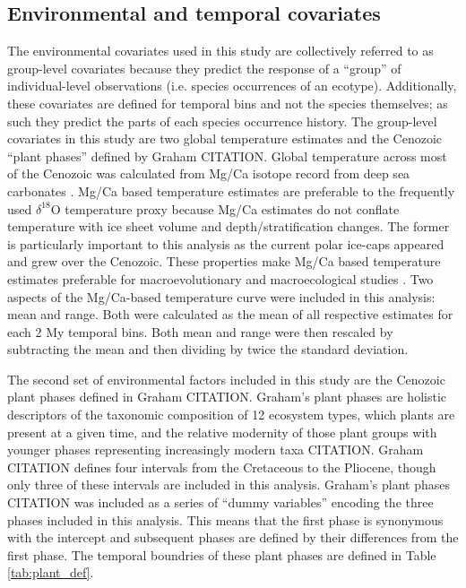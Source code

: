 \documentclass[12pt,letterpaper]{article}
\begin{document}
\subsection*{Environmental and temporal covariates}
The environmental covariates used in this study are collectively referred to as group-level covariates because they predict the response of a ``group'' of individual-level observations (i.e. species occurrences of an ecotype). Additionally, these covariates are defined for temporal bins and not the species themselves; as such they predict the parts of each species occurrence history. The group-level covariates in this study are two global temperature estimates and the Cenozoic ``plant phases'' defined by Graham CITATION. Global temperature across most of the Cenozoic was calculated from Mg/Ca isotope record from deep sea carbonates \citep{Cramer2011}. Mg/Ca based temperature estimates are preferable to the frequently used \(\delta^{18}\)O temperature proxy \citep{Zachos2001,Zachos2008,Alroy2000g,Figueirido2012} because Mg/Ca estimates do not conflate temperature with ice sheet volume and depth/stratification changes. The former is particularly important to this analysis as the current polar ice-caps appeared and grew over the Cenozoic. These properties make Mg/Ca based temperature estimates preferable for macroevolutionary and macroecological studies \citep{Ezard2016a}. Two aspects of the Mg/Ca-based temperature curve were included in this analysis: mean and range. Both were calculated as the mean of all respective estimates for each 2 My temporal bins. Both mean and range were then rescaled by subtracting the mean and then dividing by twice the standard deviation. 

The second set of environmental factors included in this study are the Cenozoic plant phases defined in Graham CITATION. Graham's plant phases are holistic descriptors of the taxonomic composition of 12 ecosystem types, which plants are present at a given time, and the relative modernity of those plant groups with younger phases representing increasingly modern taxa CITATION. Graham CITATION defines four intervals from the Cretaceous to the Pliocene, though only three of these intervals are included in this analysis. Graham's plant phases CITATION was included as a series of ``dummy variables'' encoding the three phases included in this analysis. This means that the first phase is synonymous with the intercept and subsequent phases are defined by their differences from the first phase. The temporal boundries of these plant phases are defined in Table \ref{tab:plant_def}.
\end{document}
